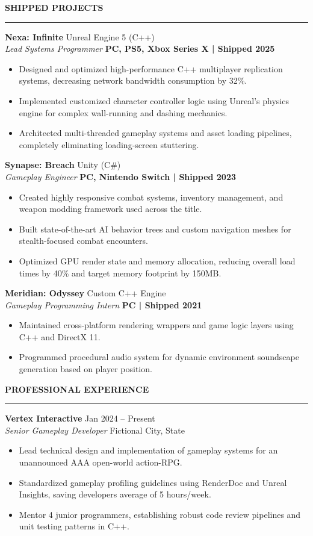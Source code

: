 \documentclass[10pt]{article}
\newcommand{\sectionbar}{%
    \par\noindent\textcolor{accent}{\rule{\linewidth}{1.5pt}}\par\vspace{4pt}%
}
\newcommand{\mainsection}[1]{%
    \vspace{8pt}%
    {\large\bfseries\textcolor{primary}{\MakeUppercase{#1}}}%
    \vspace{2pt}%
    \sectionbar%
}
\newcommand{\shippedproject}[5]{%
    \noindent\textbf{#1} \hfill \textcolor{textlight}{\small #2} \\
    \textit{#3} \hfill \textbf{\textcolor{accent}{\small #4}} \\
    \vspace{-4pt}
    \begin{itemize}
        #5
    \end{itemize}
    \vspace{6pt}
}
\begin{document}
\begin{minipage}[t]{0.62\textwidth}
    \mainsection{Shipped Projects}
    
    \shippedproject{Nexa: Infinite}{Unreal Engine 5 (C++)}{Lead Systems Programmer}{PC, PS5, Xbox Series X | Shipped 2025}{
        \item Designed and optimized high-performance C++ multiplayer replication systems, decreasing network bandwidth consumption by 32\%.
        \item Implemented customized character controller logic using Unreal's physics engine for complex wall-running and dashing mechanics.
        \item Architected multi-threaded gameplay systems and asset loading pipelines, completely eliminating loading-screen stuttering.
    }
    
    \shippedproject{Synapse: Breach}{Unity (C\#)}{Gameplay Engineer}{PC, Nintendo Switch | Shipped 2023}{
        \item Created highly responsive combat systems, inventory management, and weapon modding framework used across the title.
        \item Built state-of-the-art AI behavior trees and custom navigation meshes for stealth-focused combat encounters.
        \item Optimized GPU render state and memory allocation, reducing overall load times by 40\% and target memory footprint by 150MB.
    }

    \shippedproject{Meridian: Odyssey}{Custom C++ Engine}{Gameplay Programming Intern}{PC | Shipped 2021}{
        \item Maintained cross-platform rendering wrappers and game logic layers using C++ and DirectX 11.
        \item Programmed procedural audio system for dynamic environment soundscape generation based on player position.
    }
    
    \mainsection{Professional Experience}
    
    \textbf{Vertex Interactive} \hfill \textcolor{textlight}{\small Jan 2024 -- Present} \\
    \textit{Senior Gameplay Developer} \hfill \textcolor{accent}{\small Fictional City, State}
    \begin{itemize}
        \item Lead technical design and implementation of gameplay systems for an unannounced AAA open-world action-RPG.
        \item Standardized gameplay profiling guidelines using RenderDoc and Unreal Insights, saving developers average of 5 hours/week.
        \item Mentor 4 junior programmers, establishing robust code review pipelines and unit testing patterns in C++.
    \end{itemize}
    

\end{minipage}
\end{document}
